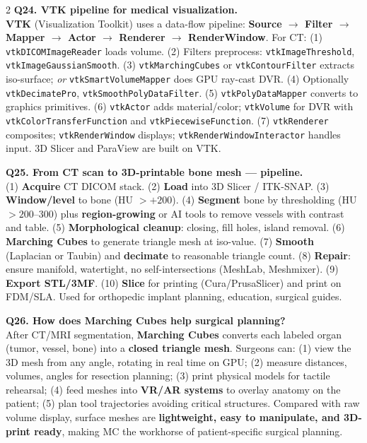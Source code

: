 \begin{paracol}{2}
\textbf{Q24. VTK pipeline for medical visualization.}\\
\textbf{VTK} (Visualization Toolkit) uses a data-flow pipeline: \textbf{Source $\to$ Filter $\to$ Mapper $\to$ Actor $\to$ Renderer $\to$ RenderWindow}. For CT: (1) \texttt{vtkDICOMImageReader} loads volume. (2) Filters preprocess: \texttt{vtkImageThreshold}, \texttt{vtkImageGaussianSmooth}. (3) \texttt{vtkMarchingCubes} or \texttt{vtkContourFilter} extracts iso-surface; \textit{or} \texttt{vtkSmartVolumeMapper} does GPU ray-cast DVR. (4) Optionally \texttt{vtkDecimatePro}, \texttt{vtkSmoothPolyDataFilter}. (5) \texttt{vtkPolyDataMapper} converts to graphics primitives. (6) \texttt{vtkActor} adds material/color; \texttt{vtkVolume} for DVR with \texttt{vtkColorTransferFunction} and \texttt{vtkPiecewiseFunction}. (7) \texttt{vtkRenderer} composites; \texttt{vtkRenderWindow} displays; \texttt{vtkRenderWindowInteractor} handles input. 3D Slicer and ParaView are built on VTK.

\textbf{Q25. From CT scan to 3D-printable bone mesh --- pipeline.}\\
(1) \textbf{Acquire} CT DICOM stack. (2) \textbf{Load} into 3D Slicer / ITK-SNAP. (3) \textbf{Window/level} to bone (HU $> +200$). (4) \textbf{Segment} bone by thresholding (HU $> 200$--300) plus \textbf{region-growing} or AI tools to remove vessels with contrast and table. (5) \textbf{Morphological cleanup}: closing, fill holes, island removal. (6) \textbf{Marching Cubes} to generate triangle mesh at iso-value. (7) \textbf{Smooth} (Laplacian or Taubin) and \textbf{decimate} to reasonable triangle count. (8) \textbf{Repair}: ensure manifold, watertight, no self-intersections (MeshLab, Meshmixer). (9) \textbf{Export STL/3MF}. (10) \textbf{Slice} for printing (Cura/PrusaSlicer) and print on FDM/SLA. Used for orthopedic implant planning, education, surgical guides.

\textbf{Q26. How does Marching Cubes help surgical planning?}\\
After CT/MRI segmentation, \textbf{Marching Cubes} converts each labeled organ (tumor, vessel, bone) into a \textbf{closed triangle mesh}. Surgeons can: (1) view the 3D mesh from any angle, rotating in real time on GPU; (2) measure distances, volumes, angles for resection planning; (3) print physical models for tactile rehearsal; (4) feed meshes into \textbf{VR/AR systems} to overlay anatomy on the patient; (5) plan tool trajectories avoiding critical structures. Compared with raw volume display, surface meshes are \textbf{lightweight, easy to manipulate, and 3D-print ready}, making MC the workhorse of patient-specific surgical planning.


\end{paracol}
